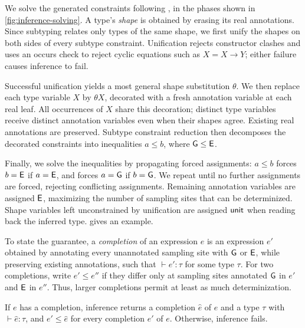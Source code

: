 

We solve the generated constraints following
\citet{traytel2011subtyping}, in the phases shown in
\cref{fig:inference-solving}. A type's \emph{shape} is obtained by
erasing its real annotations. Since subtyping relates only types of
the same shape, we first unify the shapes on both sides of every
subtype constraint. Unification rejects constructor clashes and uses
an occurs check to reject cyclic equations such as $X=X\to Y$;
either failure causes inference to fail.

Successful unification yields a most general shape substitution
$\theta$. We then replace each type variable $X$ by $\theta X$,
decorated with a fresh annotation variable at each real leaf.
All occurrences of $X$ share this decoration; distinct type variables
receive distinct annotation variables even when their shapes agree.
Existing real annotations are preserved. Subtype constraint reduction
then decomposes the decorated constraints into inequalities $a\le b$,
where $\mathsf{G}\le\mathsf{E}$.

Finally, we solve the inequalities by propagating forced
assignments: $a\le b$ forces $b=\mathsf{E}$ if $a=\mathsf{E}$, and forces
$a=\mathsf{G}$ if $b=\mathsf{G}$.
We repeat until no further assignments are forced, rejecting
conflicting assignments. Remaining annotation variables are assigned
$\mathsf{E}$, maximizing the number of sampling sites that can be
determinized. Shape variables left unconstrained by unification are
assigned $\mathsf{unit}$ when reading back the inferred type.
 gives an example.

To state the guarantee, a \emph{completion} of an expression $e$ is
an expression $e'$ obtained by annotating every unannotated sampling
site with $\mathsf{G}$ or $\mathsf{E}$, while preserving existing annotations,
such that $\vdash e':\tau$ for some type $\tau$. For two completions,
write $e'\le e''$ if they differ only at sampling sites annotated
$\mathsf{G}$ in $e'$ and $\mathsf{E}$ in $e''$. Thus, larger completions permit at
least as much determinization.

\begin{theorem}
\label{thm:inference}
If $e$ has a completion, inference returns a completion $\hat e$ of $e$
and a type $\tau$ with $\vdash\hat e:\tau$, and $e'\le\hat e$ for
every completion $e'$ of $e$. Otherwise, inference fails.
\end{theorem}

